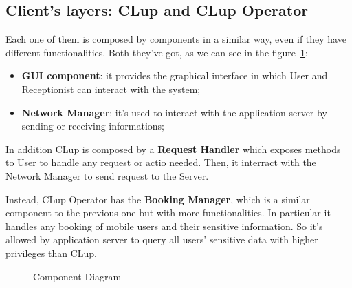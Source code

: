 \subsection{Client's layers: CLup and CLup Operator}
Each one of them is composed by components in a similar way, even if they have different functionalities.
Both they've got, as we can see in the figure~\ref{component_diagram}:
\begin{itemize} 
\item \textbf{GUI component}: it provides the graphical interface in which User and Receptionist can interact with the system;
\item \textbf{Network Manager}: it's used to interact with the application server by sending or receiving informations; 
\end{itemize}


In addition CLup is composed by a \textbf{Request Handler} which exposes methods to User to handle any request or actio needed. Then, it interract with the Network Manager to send request to the Server. 

Instead, CLup Operator has the \textbf{Booking Manager}, which is a similar component to the previous one but with more functionalities. In particular it handles any booking of mobile users and their sensitive information. So it's allowed by application server to query all users' sensitive data with higher privileges than CLup.




\begin{figure}[h]
  \label{component_diagram}
  \centering
    \caption{Component Diagram}
\end{figure}



